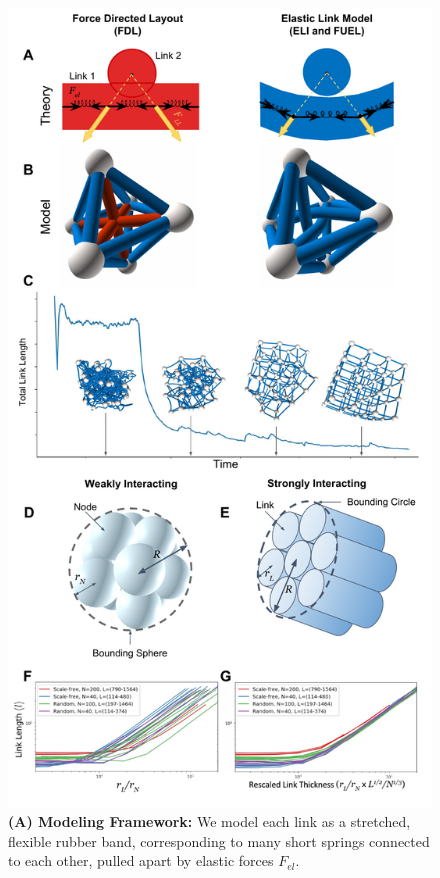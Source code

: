 \documentclass[nofootinbib,preprint,floatfix,titlepage,superscriptaddress]{revtex4} %
\begin{document}
\linespread{1.5}

\begin{figure}
    \centering
    \includegraphics[width=.7\columnwidth]{fig-09-19/3d-crs-lat-trans-112017.pdf}
    \caption{
    \scriptsize
    {\bf(A) Modeling Framework:} We model each link as a stretched, flexible rubber band, 
    corresponding to many short springs connected to each other, pulled apart by
    elastic forces $F_{el}$. 
}
\end{figure}
\end{document}
